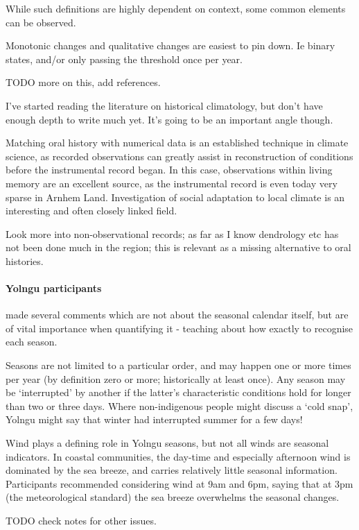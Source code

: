 While such definitions are highly dependent on context, some common
elements can be observed.  

Monotonic changes and qualitative changes are easiest to pin down.
Ie binary states, and/or only passing the threshold once per year.

TODO more on this, add references.

I've started reading the literature on historical climatology, but don't have 
enough depth to write much yet.  It's going to be an important angle though. 

Matching oral history with numerical data is an established technique in 
climate science, as recorded observations can greatly assist in reconstruction 
of conditions before the instrumental record began.  In this case, observations 
within living memory are an excellent source, as the instrumental record is 
even today very sparse in Arnhem Land.  Investigation of social adaptation to 
local climate is an interesting and often closely linked field.

Look more into non-observational records; as far as I know dendrology etc has 
not been done much in the region; this is relevant as a missing alternative to 
oral histories.


\paragraph{Yolngu participants} made several comments which are not about
the seasonal calendar itself, but are of vital importance when quantifying
it - teaching about how exactly to recognise each season.

Seasons are not limited to a particular order, and may happen one or more
times per year (by definition zero or more; historically at least once).
Any season may be `interrupted' by another if the latter's characteristic
conditions hold for longer than two or three days.
Where non-indigenous people might discuss a `cold snap', Yolngu might
say that winter had interrupted summer for a few days!

Wind plays a defining role in Yolngu seasons, but not all winds are
seasonal indicators.  In coastal communities, the day-time and especially
afternoon wind is dominated by the sea breeze, and carries relatively little
seasonal information.  Participants recommended considering wind at 9am
and 6pm, saying that at 3pm (the meteorological standard) the sea breeze
overwhelms the seasonal changes.

TODO check notes for other issues.



